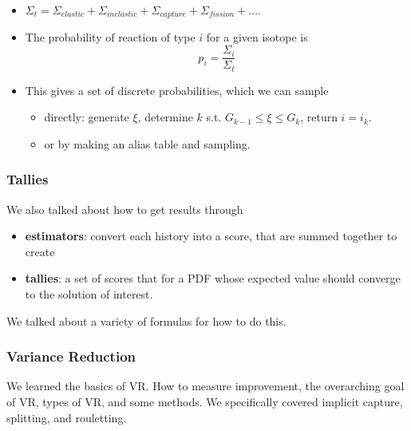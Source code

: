 \documentclass[12pt]{article}
\begin{document}
\begin{itemize}
\item $\Sigma_t = \Sigma_{elastic} + \Sigma_{inelastic} + \Sigma_{capture} + \Sigma_{fission} + \dots$.

\item The probability of reaction of type $i$ for a given isotope is 
\[p_i = \frac{\Sigma_i}{\Sigma_t}\]

\item This gives a set of discrete probabilities, which we can sample 
\begin{itemize}
\item directly: generate $\xi$, determine $k$ s.t. $G_{k-1} \leq \xi \le G_k$, return $i = i_k$.

\item or by making an alias table and sampling.
\end{itemize}

\end{itemize}


\subsubsection*{Tallies}

We also talked about how to get results through 
\begin{itemize}
\item \textbf{estimators}: convert each history into a score, that are summed together to create 
\item \textbf{tallies}: a set of scores that for a PDF whose expected value should converge to the solution of interest.
\end{itemize}

We talked about a variety of formulas for how to do this. 


\subsubsection*{Variance Reduction}
We learned the basics of VR. How to measure improvement, the overarching goal of VR, types of VR, and some methods. We specifically covered implicit capture, splitting, and rouletting.
\end{document}
